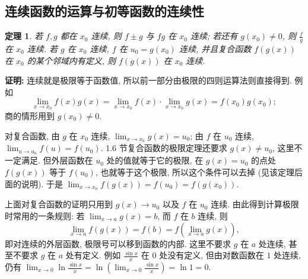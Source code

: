 \documentclass[UTF8,openany]{ctexbook}
\theoremstyle{chinesetextbook}
\newtheorem{theorem}{定理}[section]
\newenvironment{cnproof}{\par\indent\textbf{证明:} \ignorespaces}{\par}
\begin{document}
\subsection{连续函数的运算与初等函数的连续性}
\begin{theorem}
若 $f,g$ 都在 $x_0$ 连续, 则 $f\pm g$ 与 $fg$ 在 $x_0$ 连续; 若还有 $g(x_0)\ne0$, 则 $\displaystyle\frac fg$ 在 $x_0$ 连续. 若 $g$ 在 $x_0$ 连续, $f$ 在 $u_0=g(x_0)$ 连续, 并且复合函数 $f(g(x))$ 在 $x_0$ 的某个邻域内有定义, 则 $f(g(x))$ 在 $x_0$ 连续.
\end{theorem}
\begin{cnproof}
连续就是极限等于函数值, 所以前一部分由极限的四则运算法则直接得到. 例如
\[
\lim_{x\to x_0}f(x)g(x)=\lim_{x\to x_0}f(x)\cdot\lim_{x\to x_0}g(x)=f(x_0)g(x_0);
\]
商的情形用到 $g(x_0)\ne0$.

对复合函数, 由 $g$ 在 $x_0$ 连续, $\displaystyle\lim_{x\to x_0}g(x)=u_0$; 由 $f$ 在 $u_0$ 连续, $\displaystyle\lim_{u\to u_0}f(u)=f(u_0)$. 1.6 节复合函数的极限定理还要求 $g(x)\ne u_0$, 这里不一定满足. 但外层函数在 $u_0$ 处的值就等于它的极限, 在 $g(x)=u_0$ 的点处 $f(g(x))$ 等于 $f(u_0)$, 也就等于这个极限, 所以这个条件可以去掉 (见该定理后面的说明). 于是 $\displaystyle\lim_{x\to x_0}f(g(x))=f(u_0)=f(g(x_0))$.
\end{cnproof}
上面对复合函数的证明只用到 $g(x)\to u_0$ 以及 $f$ 在 $u_0$ 连续. 由此得到计算极限时常用的一条规则: 若 $\displaystyle\lim_{x\to a}g(x)=b$, 而 $f$ 在 $b$ 连续, 则
\[
\lim_{x\to a}f(g(x))=f(b)=f\left(\lim_{x\to a}g(x)\right),
\]
即对连续的外层函数, 极限号可以移到函数的内部. 这里不要求 $g$ 在 $a$ 处连续, 甚至不要求 $g$ 在 $a$ 处有定义. 例如 $\displaystyle\frac{\sin x}x$ 在 $0$ 处没有定义, 但由对数函数在 $1$ 处连续, 仍有 $\displaystyle\lim_{x\to0}\ln\frac{\sin x}x=\ln\left(\lim_{x\to0}\frac{\sin x}x\right)=\ln1=0$.
\end{document}
